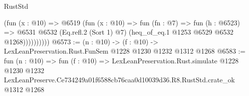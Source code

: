 \begin{lexlean}{RustStd}
\begin{coremodule}
                  (fun (x : @10) =>
                  @6519
                    (fun (x : @10) =>
                    fun (fn : @7) =>
                    fun (h : @6523) =>
                    @6531
                      @6532
                      (Eq.refl.{2} (Sort 1) @7)
                      (heq_of_eq.{1} @1253 @6529 @6532 @1268))))))))))
@6573 := (n : @10) -> (f : @10) -> LexLeanPreservation.Rust.FunSem @1228 @1230 @1232 @1312 @1268
@6583 := fun (n : @10) =>
  fun (f : @10) =>
  LexLeanPreservation.Rust.simulate
    @1228
    @1230
    @1232
    LexLeanPreserve.Ce734249a01f6588cb76caa0d10039d36.R8.RustStd.crate_ok
    @1312
    @1268
\end{coremodule}
\end{lexlean}
